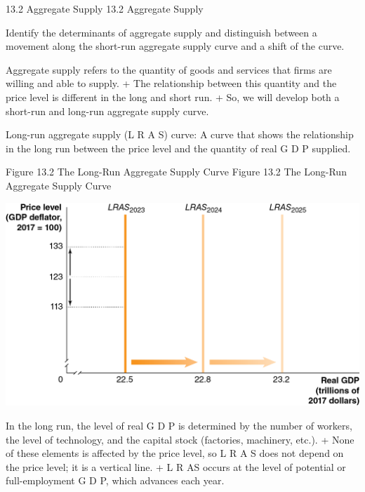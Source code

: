\documentclass[
  12pt,
  ignorenonframetext,
]{beamer}
\begin{document}
\begin{frame}{13.2 Aggregate Supply}
\protect\hypertarget{aggregate-supply}{}
13.2 Aggregate Supply

Identify the determinants of aggregate supply and distinguish between a
movement along the short-run aggregate supply curve and a shift of the
curve.

Aggregate supply refers to the quantity of goods and services that firms
are willing and able to supply. + The relationship between this quantity
and the price level is different in the long and short run. + So, we
will develop both a short-run and long-run aggregate supply curve.

Long-run aggregate supply (L R A S) curve: A curve that shows the
relationship in the long run between the price level and the quantity of
real G D P supplied.
\end{frame}

\begin{frame}{Figure 13.2 The Long-Run Aggregate Supply Curve}
\protect\hypertarget{figure-13.2-the-long-run-aggregate-supply-curve}{}
Figure 13.2 The Long-Run Aggregate Supply Curve

\includegraphics[width=\textwidth,height=0.99\textheight]{imgs3/img_slide21a.png}

In the long run, the level of real G D P is determined by the number of
workers, the level of technology, and the capital stock (factories,
machinery, etc.). + None of these elements is affected by the price
level, so L R A S does not depend on the price level; it is a vertical
line. + L R AS occurs at the level of potential or full-employment G D
P, which advances each year.
\end{frame}
\end{document}
